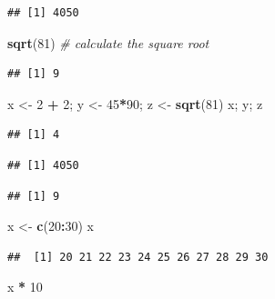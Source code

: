 \documentclass[
]{book}
\newenvironment{Shaded}{\begin{snugshade}}{\end{snugshade}}
\newcommand{\CommentTok}[1]{\textcolor[rgb]{0.56,0.35,0.01}{\textit{#1}}}
\newcommand{\DecValTok}[1]{\textcolor[rgb]{0.00,0.00,0.81}{#1}}
\newcommand{\FunctionTok}[1]{\textcolor[rgb]{0.13,0.29,0.53}{\textbf{#1}}}
\newcommand{\NormalTok}[1]{#1}
\newcommand{\OtherTok}[1]{\textcolor[rgb]{0.56,0.35,0.01}{#1}}
\newcommand{\SpecialCharTok}[1]{\textcolor[rgb]{0.81,0.36,0.00}{\textbf{#1}}}
\begin{document}
\begin{verbatim}
## [1] 4050
\end{verbatim}

\begin{Shaded}
\begin{Highlighting}[]
\FunctionTok{sqrt}\NormalTok{(}\DecValTok{81}\NormalTok{)  }\CommentTok{\# calculate the square root}
\end{Highlighting}
\end{Shaded}

\begin{verbatim}
## [1] 9
\end{verbatim}

\begin{Shaded}
\begin{Highlighting}[]
\NormalTok{x }\OtherTok{\textless{}{-}} \DecValTok{2} \SpecialCharTok{+} \DecValTok{2}\NormalTok{; y }\OtherTok{\textless{}{-}} \DecValTok{45}\SpecialCharTok{*}\DecValTok{90}\NormalTok{; z }\OtherTok{\textless{}{-}} \FunctionTok{sqrt}\NormalTok{(}\DecValTok{81}\NormalTok{)}
\NormalTok{x; y; z}
\end{Highlighting}
\end{Shaded}

\begin{verbatim}
## [1] 4
\end{verbatim}

\begin{verbatim}
## [1] 4050
\end{verbatim}

\begin{verbatim}
## [1] 9
\end{verbatim}

\begin{Shaded}
\begin{Highlighting}[]
\NormalTok{x }\OtherTok{\textless{}{-}} \FunctionTok{c}\NormalTok{(}\DecValTok{20}\SpecialCharTok{:}\DecValTok{30}\NormalTok{)}
\NormalTok{x}
\end{Highlighting}
\end{Shaded}

\begin{verbatim}
##  [1] 20 21 22 23 24 25 26 27 28 29 30
\end{verbatim}

\begin{Shaded}
\begin{Highlighting}[]
\NormalTok{x }\SpecialCharTok{*} \DecValTok{10}
\end{Highlighting}
\end{Shaded}
\end{document}
